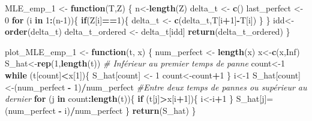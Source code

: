 \documentclass[
]{article}
\newenvironment{Shaded}{\begin{snugshade}}{\end{snugshade}}
\newcommand{\CommentTok}[1]{\textcolor[rgb]{0.56,0.35,0.01}{\textit{#1}}}
\newcommand{\ConstantTok}[1]{\textcolor[rgb]{0.56,0.35,0.01}{#1}}
\newcommand{\ControlFlowTok}[1]{\textcolor[rgb]{0.13,0.29,0.53}{\textbf{#1}}}
\newcommand{\DecValTok}[1]{\textcolor[rgb]{0.00,0.00,0.81}{#1}}
\newcommand{\FunctionTok}[1]{\textcolor[rgb]{0.13,0.29,0.53}{\textbf{#1}}}
\newcommand{\NormalTok}[1]{#1}
\newcommand{\OtherTok}[1]{\textcolor[rgb]{0.56,0.35,0.01}{#1}}
\newcommand{\SpecialCharTok}[1]{\textcolor[rgb]{0.81,0.36,0.00}{\textbf{#1}}}
\begin{document}
\begin{Shaded}
\begin{Highlighting}[]
\NormalTok{MLE\_emp\_1 }\OtherTok{\textless{}{-}} \ControlFlowTok{function}\NormalTok{(T,Z)}
\NormalTok{\{}
\NormalTok{  n}\OtherTok{\textless{}{-}}\FunctionTok{length}\NormalTok{(Z)}
\NormalTok{  delta\_t }\OtherTok{\textless{}{-}} \FunctionTok{c}\NormalTok{()}
\NormalTok{  last\_perfect }\OtherTok{\textless{}{-}} \DecValTok{0}
  \ControlFlowTok{for}\NormalTok{ (i }\ControlFlowTok{in} \DecValTok{1}\SpecialCharTok{:}\NormalTok{(n}\DecValTok{{-}1}\NormalTok{))\{}
    \ControlFlowTok{if}\NormalTok{(Z[i]}\SpecialCharTok{==}\DecValTok{1}\NormalTok{)\{}
\NormalTok{      delta\_t }\OtherTok{\textless{}{-}} \FunctionTok{c}\NormalTok{(delta\_t,T[i}\SpecialCharTok{+}\DecValTok{1}\NormalTok{]}\SpecialCharTok{{-}}\NormalTok{T[i])}
\NormalTok{    \}}
\NormalTok{  \}}
\NormalTok{  idd}\OtherTok{\textless{}{-}}\FunctionTok{order}\NormalTok{(delta\_t)}
\NormalTok{  delta\_t\_ordered }\OtherTok{\textless{}{-}}\NormalTok{ delta\_t[idd]}
  \FunctionTok{return}\NormalTok{(delta\_t\_ordered)}
\NormalTok{\}}

\NormalTok{plot\_MLE\_emp\_1 }\OtherTok{\textless{}{-}} \ControlFlowTok{function}\NormalTok{(t, x)}
\NormalTok{\{}
\NormalTok{  num\_perfect }\OtherTok{\textless{}{-}} \FunctionTok{length}\NormalTok{(x)}
\NormalTok{  x}\OtherTok{\textless{}{-}}\FunctionTok{c}\NormalTok{(x,}\ConstantTok{Inf}\NormalTok{)}
\NormalTok{  S\_hat}\OtherTok{\textless{}{-}}\FunctionTok{rep}\NormalTok{(}\DecValTok{1}\NormalTok{,}\FunctionTok{length}\NormalTok{(t))}
  \CommentTok{\# Inférieur au premier temps de panne}
\NormalTok{  count}\OtherTok{\textless{}{-}}\DecValTok{1}
  \ControlFlowTok{while}\NormalTok{ (t[count]}\SpecialCharTok{\textless{}}\NormalTok{x[}\DecValTok{1}\NormalTok{])\{}
\NormalTok{    S\_hat[count] }\OtherTok{\textless{}{-}} \DecValTok{1}
\NormalTok{    count}\OtherTok{\textless{}{-}}\NormalTok{count}\SpecialCharTok{+}\DecValTok{1}
\NormalTok{  \}}
\NormalTok{  i}\OtherTok{\textless{}{-}}\DecValTok{1}
\NormalTok{  S\_hat[count]}\OtherTok{\textless{}{-}}\NormalTok{(num\_perfect }\SpecialCharTok{{-}} \DecValTok{1}\NormalTok{)}\SpecialCharTok{/}\NormalTok{num\_perfect}
  \CommentTok{\#Entre deux temps de pannes ou supérieur au dernier}
  \ControlFlowTok{for}\NormalTok{ (j }\ControlFlowTok{in}\NormalTok{ count}\SpecialCharTok{:}\FunctionTok{length}\NormalTok{(t))\{}
    \ControlFlowTok{if}\NormalTok{ (t[j]}\SpecialCharTok{\textgreater{}}\NormalTok{x[i}\SpecialCharTok{+}\DecValTok{1}\NormalTok{])\{}
\NormalTok{      i}\OtherTok{\textless{}{-}}\NormalTok{i}\SpecialCharTok{+}\DecValTok{1}
\NormalTok{    \}}
\NormalTok{    S\_hat[j]}\OtherTok{=}\NormalTok{(num\_perfect }\SpecialCharTok{{-}}\NormalTok{ i)}\SpecialCharTok{/}\NormalTok{num\_perfect}
\NormalTok{  \}}
  \FunctionTok{return}\NormalTok{(S\_hat)}
\NormalTok{\}}
\end{Highlighting}
\end{Shaded}
\end{document}
